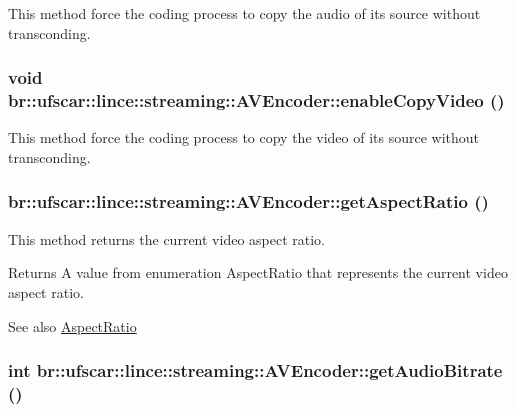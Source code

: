 This method force the coding process to copy the audio of its source without transconding. 

\hypertarget{classbr_1_1ufscar_1_1lince_1_1streaming_1_1AVEncoder_aa611299f6eaf0232f3530b8bfe0c23e3}{
\subsubsection[{enableCopyVideo}]{\setlength{\rightskip}{0pt plus 5cm}void br::ufscar::lince::streaming::AVEncoder::enableCopyVideo ()}}
\label{classbr_1_1ufscar_1_1lince_1_1streaming_1_1AVEncoder_aa611299f6eaf0232f3530b8bfe0c23e3}


This method force the coding process to copy the video of its source without transconding. 

\hypertarget{classbr_1_1ufscar_1_1lince_1_1streaming_1_1AVEncoder_a52bb57fa4d0fabff9a30c73d0f37729f}{
\subsubsection[{getAspectRatio}]{ br::ufscar::lince::streaming::AVEncoder::getAspectRatio ()}}
\label{classbr_1_1ufscar_1_1lince_1_1streaming_1_1AVEncoder_a52bb57fa4d0fabff9a30c73d0f37729f}


This method returns the current video aspect ratio. 

\begin{DoxyReturn}{Returns}
A value from enumeration AspectRatio that represents the current video aspect ratio. 
\end{DoxyReturn}
\begin{DoxySeeAlso}{See also}
\hyperlink{namespacebr_1_1ufscar_1_1lince_1_1streaming_a4b30a3170430e0fc8bacd10d9c602bb8}{AspectRatio} 
\end{DoxySeeAlso}
\hypertarget{classbr_1_1ufscar_1_1lince_1_1streaming_1_1AVEncoder_a37dd03d0ed094b78bf0e2b10432aca5a}{
\subsubsection[{getAudioBitrate}]{\setlength{\rightskip}{0pt plus 5cm}int br::ufscar::lince::streaming::AVEncoder::getAudioBitrate ()}}
\label{classbr_1_1ufscar_1_1lince_1_1streaming_1_1AVEncoder_a37dd03d0ed094b78bf0e2b10432aca5a}


